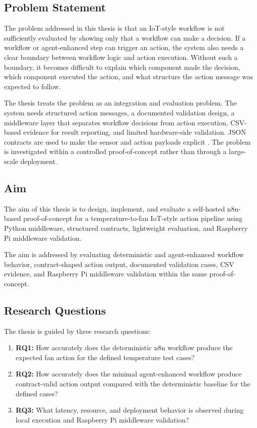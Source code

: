 \subsection{Problem Statement}\label{subsec:problem-statement}

The problem addressed in this thesis is that an IoT-style workflow is not sufficiently evaluated by showing only that a workflow can make a decision. If a workflow or agent-enhanced step can trigger an action, the system also needs a clear boundary between workflow logic and action execution. Without such a boundary, it becomes difficult to explain which component made the decision, which component executed the action, and what structure the action message was expected to follow.

The thesis treats the problem as an integration and evaluation problem. The system needs structured action messages, a documented validation design, a middleware layer that separates workflow decisions from action execution, CSV-based evidence for result reporting, and limited hardware-side validation. JSON contracts are used to make the sensor and action payloads explicit \cite{jsonSchemaDocs}. The problem is investigated within a controlled proof-of-concept rather than through a large-scale deployment.

\subsection{Aim}\label{subsec:aim}

The aim of this thesis is to design, implement, and evaluate a self-hosted n8n-based proof-of-concept for a temperature-to-fan IoT-style action pipeline using Python middleware, structured contracts, lightweight evaluation, and Raspberry Pi middleware validation.

The aim is addressed by evaluating deterministic and agent-enhanced workflow behavior, contract-shaped action output, documented validation cases, CSV evidence, and Raspberry Pi middleware validation within the same proof-of-concept.

\subsection{Research Questions}\label{subsec:research-questions}

The thesis is guided by three research questions:

\begin{enumerate}
  \item \textbf{RQ1:} How accurately does the deterministic n8n workflow produce the expected fan action for the defined temperature test cases?
  \item \textbf{RQ2:} How accurately does the minimal agent-enhanced workflow produce contract-valid action output compared with the deterministic baseline for the defined cases?
  \item \textbf{RQ3:} What latency, resource, and deployment behavior is observed during local execution and Raspberry Pi middleware validation?
\end{enumerate}

